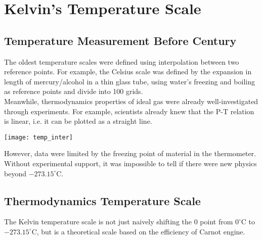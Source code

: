 \documentclass[class=article, crop=false, 12pt]{standalone}
\begin{document}
\linesep
\section{Kelvin's Temperature Scale}

\subsection{Temperature Measurement Before  Century}

The oldest temperature scales were defined using interpolation between two reference points.
For example, the Celsius scale was defined by the expansion in length of mercury/alcohol in a thin glass tube,
using water's freezing and boiling as reference points and divide into 100 grids.\\

Meanwhile, thermodynamics properties of ideal gas were already well-investigated through experiments.
For example, scientists already knew that the P-T relation is linear,
i.e. it can be plotted as a straight line.

\begin{center}
    \begin{minipage}{0.8\linewidth}
        \centering
        \texttt{[image: temp\_inter]}
    \end{minipage}
\end{center}

However, data were limited by the freezing point of material in the thermometer.
Without experimental support, it was impossible to tell if there were new physics beyond $-273.15^\circ$C.


\subsection{Thermodynamics Temperature Scale}

The Kelvin temperature scale is not just naively shifting the $0$ point from $0^\circ$C to $-273.15^\circ$C,
but is a theoretical scale based on the efficiency of Carnot engine.
\end{document}
